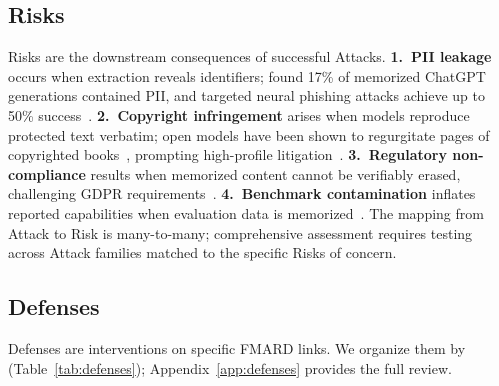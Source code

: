 \documentclass[11pt]{article}
\begin{document}
\subsection{Risks}
\label{sec:risks}

Risks are the downstream consequences of successful Attacks.
\textbf{1.~PII leakage} occurs when extraction reveals identifiers;
\citet{nasr2023scalableextractiontrainingdata} found 17\% of memorized ChatGPT
generations contained PII, and targeted neural phishing attacks achieve up to
50\% success~\citep{panda2024teach}.
\textbf{2.~Copyright infringement} arises when models reproduce protected text
verbatim; open models have been shown to regurgitate pages of copyrighted
books~\citep{henderson2023foundation, carlini2023quantifyingmemorizationneurallanguage},
prompting high-profile litigation~\citep{nytimes_v_microsoft_2023}.
\textbf{3.~Regulatory non-compliance} results when memorized content cannot be
verifiably erased, challenging GDPR
requirements~\citep{schwarzschild2024rethinking}.
\textbf{4.~Benchmark contamination} inflates reported capabilities when
evaluation data is memorized~\citep{magar2022data}.
The mapping from Attack to Risk is many-to-many; comprehensive assessment
requires testing across Attack families matched to the specific Risks of
concern.


\subsection{Defenses}
\label{sec:defenses}

Defenses are interventions on specific FMARD links.
We organize them by 
(Table~\ref{tab:defenses}); Appendix~\ref{app:defenses} provides the full
review.
\end{document}
